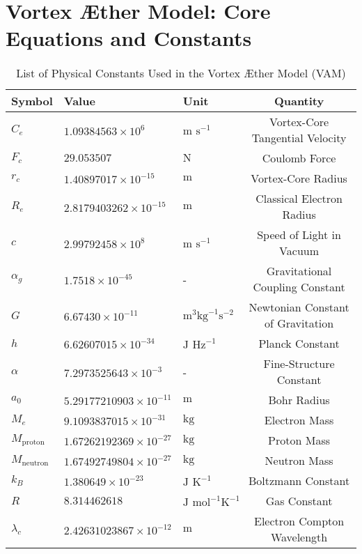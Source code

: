 


\section*{Vortex Æther Model: Core Equations and Constants}

    \begin{table}[htbp]
        \centering
        \renewcommand{\arraystretch}{1.0}
        \begin{tabular}{lllc}
            \toprule
            \textbf{Symbol} & \textbf{Value} & \textbf{Unit} & \textbf{Quantity} \\
            \midrule
            $C_e$ & $1.09384563 \times 10^6$ & $\text{m s}^{-1}$ & Vortex-Core Tangential Velocity \\
            $F_c$ & $29.053507$ & $\text{N}$ & Coulomb Force \\
            $r_c$ & $1.40897017 \times 10^{-15}$ & $\text{m}$ & Vortex-Core Radius \\
            $R_e$ & $2.8179403262 \times 10^{-15}$ & $\text{m}$ & Classical Electron Radius \\
            $c$ & $2.99792458 \times 10^8$ & $\text{m s}^{-1}$ & Speed of Light in Vacuum \\
            $\alpha_g$ & $1.7518 \times 10^{-45}$ & - & Gravitational Coupling Constant \\
            $G$ & $6.67430 \times 10^{-11}$ & $\text{m}^3 \text{kg}^{-1} \text{s}^{-2}$ & Newtonian Constant of Gravitation \\
            $h$ & $6.62607015 \times 10^{-34}$ & $\text{J Hz}^{-1}$ & Planck Constant \\
            $\alpha$ & $7.2973525643 \times 10^{-3}$ & - & Fine-Structure Constant \\
            $a_0$ & $5.29177210903 \times 10^{-11}$ & $\text{m}$ & Bohr Radius \\
            $M_e$ & $9.1093837015 \times 10^{-31}$ & $\text{kg}$ & Electron Mass \\
            $M_\text{proton}$ & $1.67262192369 \times 10^{-27}$ & $\text{kg}$ & Proton Mass \\
            $M_\text{neutron}$ & $1.67492749804 \times 10^{-27}$ & $\text{kg}$ & Neutron Mass \\
            $k_B$ & $1.380649 \times 10^{-23}$ & $\text{J K}^{-1}$ & Boltzmann Constant \\
            $R$ & $8.314462618$ & $\text{J mol}^{-1} \text{K}^{-1}$ & Gas Constant \\
            $\lambda_c$ & $2.42631023867 \times 10^{-12}$ & $\text{m}$ & Electron Compton Wavelength \\
            \bottomrule
        \end{tabular}
        \caption{List of Physical Constants Used in the Vortex Æther Model (VAM)}
        \label{tab:vam_constants}
    \end{table}


